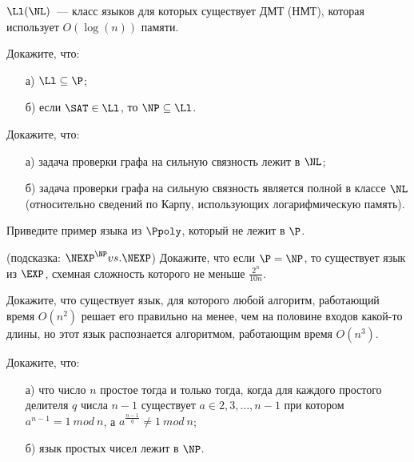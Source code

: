 

$\Ll (\NL)$~--- класс языков для которых существует ДМТ (НМТ), которая использует $O(\log(n))$ памяти.

\begin{task}
    Докажите, что:
    \begin{enumerate}[topsep = 0pt, itemsep = -1ex]
        \item [а)] $\Ll \subseteq \P$;
        \item [б)] если $\SAT \in \Ll$, то $\NP \subseteq \Ll$.
	\end{enumerate}
\end{task}

\begin{task}
    Докажите, что:
    \begin{enumerate}[topsep = 0pt, itemsep = -1ex]
        \item [а)] задача проверки графа на сильную связность лежит в $\NL$;
        \item [б)] задача проверки графа на сильную связность является полной в классе $\NL$ (относительно сведений по Карпу,
            использующих логарифмическую память).
	\end{enumerate}
\end{task}


\begin{task}
	Приведите пример языка из $\Ppoly$, который не лежит в $\P$. 
\end{task}

\begin{task}(подсказка: $\NEXP^{\NP} vs. \NEXP$)
    Докажите, что если $\P = \NP$, то существует язык из $\EXP$, схемная сложность которого не меньше $\frac{2^n}{10 n}$.
\end{task}

\begin{task}
	Докажите, что существует язык, для которого любой алгоритм, работающий время $O(n^2)$ решает его правильно на менее, чем на
    половине входов какой-то длины, но этот язык распознается алгоритмом, работающим время $O(n^3)$.
\end{task}



\breakline


\begin{ptask}{10}
    Докажите, что:
   	\begin{enumerate}[topsep = 0pt, itemsep = -1ex]
        \item [а)] что число $n$ простое тогда и только тогда, когда для каждого простого делителя $q$ числа $n - 1$ существует $a
            \in {2, 3, \dots, n - 1}$ при котором $a^{n - 1} = 1~mod~n$, а $a^{\frac{n - 1}{q}} \ne 1~mod~n$;
        \item [б)] язык простых чисел лежит в $\NP$.
	\end{enumerate}
\end{ptask}


